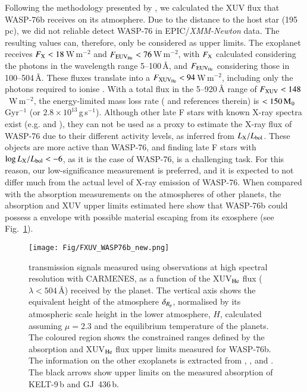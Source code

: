 \documentclass{aa}
\begin{document}
Following the methodology presented by \citet{Nortmann2018Science}, we calculated the XUV flux that WASP-76b receives on its atmosphere. Due to the distance to the host star (195\,pc), we did not reliable detect WASP-76 in
EPIC/{\em XMM-Newton} data. The resulting values can, therefore, only be considered as upper limits. The exoplanet receives $F_{\rm X}< 18$\,W\,m$^{-2}$ and $F_{\rm EUV_{He}}<76$\,W\,m$^{-2}$, with $F_{\rm X}$ calculated considering the photons in the wavelength range 5--100\,{\AA}, and $F_{\rm EUV_{He}}$ considering those in 100--504\,{\AA}. 
These fluxes translate into a $F_{\rm XUV_{He}}<94$\,W\,m$^{-2}$, including only the photons required to ionise . With a total flux in the 5--920\,{\AA} range of $F_{\rm XUV} < 148$~W\,m$^{-2}$, the energy-limited mass loss rate (\citealt{SanzForcada2011} and references therein) is $< 150\,{\rm M}_{\oplus}$\,Gyr$^{-1}$ (or $2.8\times10^{13}$\,g\,s$^{-1}$). Although other late F stars with known X-ray spectra exist (e.g.  and ), they can not be used as a proxy to estimate the X-ray flux of WASP-76 due to their different activity levels, as inferred from $L_{\rm X}/L_{\rm bol}$. These objects are more active than WASP-76, and finding late F stars with $\log L_{\rm X}/L_{\rm bol} < -6$, as it is the case of WASP-76, is a challenging task. For this reason, our low-significance measurement is preferred, and it is expected to not differ much from the actual level of X-ray emission of WASP-76. When compared with the  absorption measurements on the atmospheres of other planets, the absorption and XUV upper limits estimated here show that WASP-76b could possess a  envelope with possible material escaping from its exosphere (see Fig.~\ref{fig:XUV}).

\begin{figure}[]
\centering
\texttt{[image: Fig/FXUV\_WASP76b\_new.png]}
\caption{ transmission signals measured using observations at high spectral resolution with CARMENES, as a function of the XUV$_{\rm He}$ flux ($\lambda <504$\,{\AA}) received by the planet. The vertical axis shows the equivalent height of the  atmosphere $\delta_{R_{\rm p}}$, normalised by its atmospheric scale height in the lower atmosphere, $H$, calculated assuming $\mu=2.3$ and the equilibrium temperature of the planets. The coloured region shows the constrained ranges defined by the  absorption and XUV$_{\rm He}$ flux upper limits measured for WASP-76b. The information on the other exoplanets is extracted from \citet{Nortmann2018Science}, \citet{AlonsoFloriano2019HD209}, and \citet{Palle2020a}. 
The black arrows show upper limits on the measured  absorption of KELT-9\,b and GJ~436\,b.}
\label{fig:XUV}
\end{figure}
\end{document}
